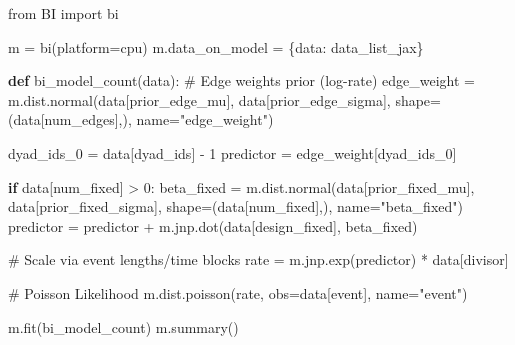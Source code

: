 \documentclass[
  letterpaper,
  DIV=11,
  numbers=noendperiod]{scrartcl}
\newenvironment{Shaded}{\begin{snugshade}}{\end{snugshade}}
\newcommand{\CommentTok}[1]{\textcolor[rgb]{0.37,0.37,0.37}{#1}}
\newcommand{\ControlFlowTok}[1]{\textcolor[rgb]{0.00,0.23,0.31}{\textbf{#1}}}
\newcommand{\DecValTok}[1]{\textcolor[rgb]{0.68,0.00,0.00}{#1}}
\newcommand{\ImportTok}[1]{\textcolor[rgb]{0.00,0.46,0.62}{#1}}
\newcommand{\KeywordTok}[1]{\textcolor[rgb]{0.00,0.23,0.31}{\textbf{#1}}}
\newcommand{\NormalTok}[1]{\textcolor[rgb]{0.00,0.23,0.31}{#1}}
\newcommand{\OperatorTok}[1]{\textcolor[rgb]{0.37,0.37,0.37}{#1}}
\newcommand{\StringTok}[1]{\textcolor[rgb]{0.13,0.47,0.30}{#1}}
\begin{document}
\begin{Shaded}
\begin{Highlighting}[]
\ImportTok{from}\NormalTok{ BI }\ImportTok{import}\NormalTok{ bi}

\NormalTok{m }\OperatorTok{=}\NormalTok{ bi(platform}\OperatorTok{=}\StringTok{\textquotesingle{}cpu\textquotesingle{}}\NormalTok{)}
\NormalTok{m.data\_on\_model }\OperatorTok{=}\NormalTok{ \{}\StringTok{\textquotesingle{}data\textquotesingle{}}\NormalTok{: data\_list\_jax\} }

\KeywordTok{def}\NormalTok{ bi\_model\_count(data):}
    \CommentTok{\# Edge weights prior (log{-}rate)}
\NormalTok{    edge\_weight }\OperatorTok{=}\NormalTok{ m.dist.normal(data[}\StringTok{\textquotesingle{}prior\_edge\_mu\textquotesingle{}}\NormalTok{], data[}\StringTok{\textquotesingle{}prior\_edge\_sigma\textquotesingle{}}\NormalTok{], }
\NormalTok{                                shape}\OperatorTok{=}\NormalTok{(data[}\StringTok{\textquotesingle{}num\_edges\textquotesingle{}}\NormalTok{],), name}\OperatorTok{=}\StringTok{"edge\_weight"}\NormalTok{)}
    
\NormalTok{    dyad\_ids\_0 }\OperatorTok{=}\NormalTok{ data[}\StringTok{\textquotesingle{}dyad\_ids\textquotesingle{}}\NormalTok{] }\OperatorTok{{-}} \DecValTok{1}
\NormalTok{    predictor }\OperatorTok{=}\NormalTok{ edge\_weight[dyad\_ids\_0]}
    
    \ControlFlowTok{if}\NormalTok{ data[}\StringTok{\textquotesingle{}num\_fixed\textquotesingle{}}\NormalTok{] }\OperatorTok{\textgreater{}} \DecValTok{0}\NormalTok{:}
\NormalTok{        beta\_fixed }\OperatorTok{=}\NormalTok{ m.dist.normal(data[}\StringTok{\textquotesingle{}prior\_fixed\_mu\textquotesingle{}}\NormalTok{], data[}\StringTok{\textquotesingle{}prior\_fixed\_sigma\textquotesingle{}}\NormalTok{], }
\NormalTok{                                   shape}\OperatorTok{=}\NormalTok{(data[}\StringTok{\textquotesingle{}num\_fixed\textquotesingle{}}\NormalTok{],), name}\OperatorTok{=}\StringTok{"beta\_fixed"}\NormalTok{)}
\NormalTok{        predictor }\OperatorTok{=}\NormalTok{ predictor }\OperatorTok{+}\NormalTok{ m.jnp.dot(data[}\StringTok{\textquotesingle{}design\_fixed\textquotesingle{}}\NormalTok{], beta\_fixed)}
    
    \CommentTok{\# Scale via event lengths/time blocks}
\NormalTok{    rate }\OperatorTok{=}\NormalTok{ m.jnp.exp(predictor) }\OperatorTok{*}\NormalTok{ data[}\StringTok{\textquotesingle{}divisor\textquotesingle{}}\NormalTok{]}
    
    \CommentTok{\# Poisson Likelihood}
\NormalTok{    m.dist.poisson(rate, obs}\OperatorTok{=}\NormalTok{data[}\StringTok{\textquotesingle{}event\textquotesingle{}}\NormalTok{], name}\OperatorTok{=}\StringTok{"event"}\NormalTok{)}

\NormalTok{m.fit(bi\_model\_count)}
\NormalTok{m.summary()}
\end{Highlighting}
\end{Shaded}
\end{document}
